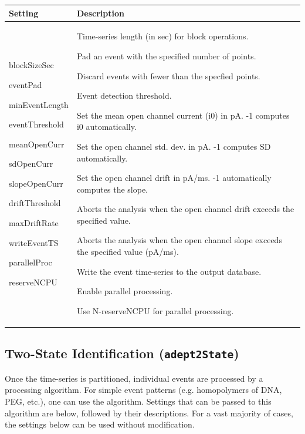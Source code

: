 \documentclass[letterpaper,10pt,english]{sphinxmanual}
\begin{document}
\begin{tabulary}{\linewidth}{p{4cm}p{12cm}}
\hline
\textsf{\relax 
\textbf{Setting}
} & \textsf{\relax 
\textbf{Description}
}\\
\hline
blockSizeSec

eventPad

minEventLength

eventThreshold

meanOpenCurr

sdOpenCurr

slopeOpenCurr

driftThreshold

maxDriftRate

writeEventTS

parallelProc

reserveNCPU
 & 
Time-series length (in sec) for block operations.

Pad an event with the specified number of points.

Discard events with fewer than the specfied points.

Event detection threshold.

Set the mean open channel current (i0) in pA. -1 computes i0 automatically.

Set the open channel std. dev. in pA. -1 computes SD automatically.

Set the open channel drift in pA/ms. -1 automatically computes the slope.

Aborts the analysis when the open channel drift exceeds the specified value.

Aborts the analysis when the open channel slope exceeds the specified value (pA/ms).

Write the event time-series to the output database.

Enable parallel processing.

Use N-reserveNCPU for parallel processing.
\\
\hline\end{tabulary}



\subsection{Two-State Identification  (\texttt{adept2State})}
\label{doc/settingsFile:two-state-identification-adept2state}\label{doc/settingsFile:stepresp-settings-sec}
Once the time-series is partitioned, individual events are processed by a processing algorithm. For simple event patterns (e.g. homopolymers of DNA, PEG, etc.), one can use the  algorithm. Settings that can be passed to this algorithm are below, followed by their descriptions. For a vast majority of cases, the settings below can be used without modification.
\end{document}
